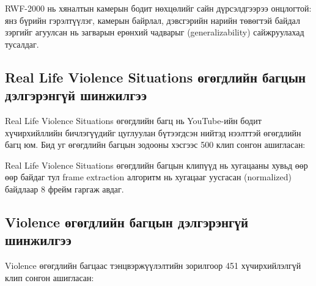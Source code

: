 RWF-2000 нь хяналтын камерын бодит нөхцөлийг сайн дүрсэлдгээрээ онцлогтой: янз бүрийн гэрэлтүүлэг, камерын байрлал, дэвсгэрийн нарийн төвөгтэй байдал зэргийг агуулсан нь загварын ерөнхий чадварыг (generalizability) сайжруулахад тусалдаг.

\subsection{Real Life Violence Situations өгөгдлийн багцын дэлгэрэнгүй шинжилгээ}

Real Life Violence Situations өгөгдлийн багц нь YouTube-ийн бодит хүчирхийллийн бичлэгүүдийг цуглуулан бүтээгдсэн нийтэд нээлттэй өгөгдлийн багц юм. Бид уг өгөгдлийн багцын зодооны хэсгээс 500 клип сонгон ашигласан:

\begin{table}[htbp]
\centering
\caption{Real Life Violence Situations өгөгдлийн багцын статистик}
\label{tab:ucfcrime_stats}
\end{table}

Real Life Violence Situations өгөгдлийн багцын клипүүд нь хугацааны хувьд өөр өөр байдаг тул frame extraction алгоритм нь хугацааг уусгасан (normalized) байдлаар 8 фрейм гаргаж авдаг.

\subsection{Violence өгөгдлийн багцын дэлгэрэнгүй шинжилгээ}

Violence өгөгдлийн багцаас тэнцвэржүүлэлтийн зорилгоор 451 хүчирхийлэлгүй клип сонгон ашигласан:

